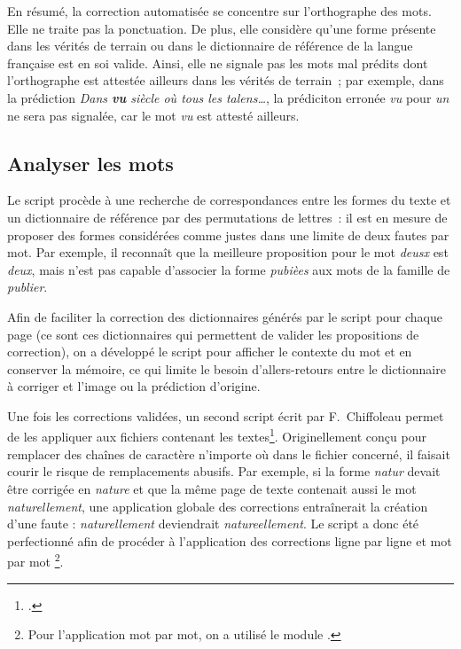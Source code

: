 \documentclass[a4paper,12pt,twoside]{book}
\begin{document}
				En résumé, la correction automatisée se concentre sur l'orthographe des mots. Elle ne traite pas la ponctuation. De plus, elle considère qu'une forme présente dans les vérités de terrain ou dans le dictionnaire de référence de la langue française est en soi valide. Ainsi, elle ne signale pas les mots mal prédits dont l'orthographe est attestée ailleurs dans les vérités de terrain~; par exemple, dans la prédiction \textit{Dans \textbf{vu} siècle où tous les talens…}, la prédiciton erronée \textit{vu} pour \textit{un} ne sera pas signalée, car le mot \textit{vu} est attesté ailleurs.
					
			\subsection{Analyser les mots}
				Le script procède à une recherche de correspondances entre les formes du texte et un dictionnaire de référence par des permutations de lettres~: il est en mesure de proposer des formes considérées comme justes dans une limite de deux fautes par mot. Par exemple, il reconnaît que la meilleure proposition pour le mot \textit{deusx} est \textit{deux}, mais n'est pas capable d'associer la forme \textit{pubièes} aux mots de la famille de \textit{publier}.
						
				Afin de faciliter la correction des dictionnaires générés par le script pour chaque page (ce sont ces dictionnaires qui permettent de valider les propositions de correction), on a développé le script pour afficher le contexte du mot et en conserver la mémoire, ce qui limite le besoin d'allers-retours entre le dictionnaire à corriger et l'image ou la prédiction d'origine.
				
				Une fois les corrections validées, un second script écrit par F.~Chiffoleau permet de les appliquer aux fichiers contenant les textes\footcite{biayTextCorrectionPy2022}. Originellement conçu pour remplacer des chaînes de caractère n'importe où dans le fichier concerné, il faisait courir le risque de remplacements abusifs. Par exemple, si la forme \textit{natur} devait être corrigée en \textit{nature} et que la même page de texte contenait aussi le mot \textit{naturellement}, une application globale des corrections entraînerait la création d'une faute : \textit{naturellement} deviendrait \textit{natureellement}. Le script a donc été perfectionné afin de procéder à l'application des corrections ligne par ligne et mot par mot
				\footnote{Pour l'application mot par mot, on a utilisé le module \cite{SpaCyIndustrialstrengthNatural}.}.
				
\end{document}
